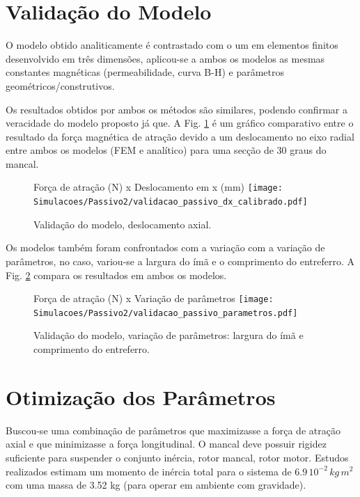 \section{Validação do Modelo}

O modelo obtido analiticamente é contrastado com o um em elementos finitos desenvolvido em três dimensões, aplicou-se a ambos os modelos as mesmas constantes magnéticas (permeabilidade, curva B-H) e parâmetros geométricos/construtivos.

Os resultados obtidos por ambos os métodos são similares, podendo confirmar a veracidade do modelo proposto já que. A Fig. \ref{fig:validacao_passivo_dx_calibrado} é um gráfico comparativo entre o resultado da força magnética de atração devido a um deslocamento no eixo radial entre ambos os modelos (FEM e analítico) para uma secção de 30 graus do mancal.

\begin{figure}[th!]
	\centering
	Força de atração (N) x Deslocamento em x (mm)
	\texttt{[image: Simulacoes/Passivo2/validacao\_passivo\_dx\_calibrado.pdf]}
	\caption{Validação do modelo, deslocamento axial.}
	\label{fig:validacao_passivo_dx_calibrado}
\end{figure}

Os modelos também foram confrontados com a variação com a variação de parâmetros, no caso, variou-se a largura do ímã e o comprimento do entreferro. A Fig. \ref{fig:validacao_passivo_parametros} compara os resultados em ambos os modelos.

\begin{figure}[th!]
	\centering
	Força de atração (N) x Variação de parâmetros
	\texttt{[image: Simulacoes/Passivo2/validacao\_passivo\_parametros.pdf]}
	\caption{Validação do modelo, variação de parâmetros: largura do ímã e comprimento do entreferro.}
	\label{fig:validacao_passivo_parametros}
\end{figure} 


\section{Otimização dos Parâmetros}

Buscou-se uma combinação de parâmetros que maximizasse a força de atração axial e que minimizasse a força longitudinal. O mancal deve possuir rigidez suficiente para suspender o conjunto inércia, rotor mancal, rotor motor. Estudos realizados estimam um momento de inércia total para o sistema de $6.9 \, 10^{-2} \, kg \, m^2$ com uma massa de 3.52 kg (para operar em ambiente com gravidade). 


